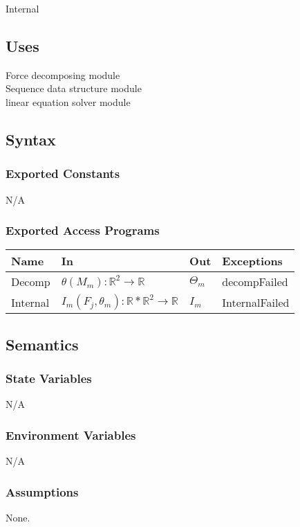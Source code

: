 \documentclass[12pt, titlepage]{article}
\begin{document}
Internal

\subsection{Uses}
Force decomposing module\\
Sequence data structure module\\
linear equation solver module\\



\subsection{Syntax}

\subsubsection{Exported Constants}
N/A
\subsubsection{Exported Access Programs}
\begin{center}
\begin{tabular}{p{2cm} p{4cm} p{4cm} p{2cm}}
\hline
\textbf{Name} & \textbf{In} & \textbf{Out} & \textbf{Exceptions} \\
\hline
Decomp & $\theta(M_{m}):\mathbb{R}^{2} \rightarrow \mathbb{R}$  &$\Theta_m$ & decompFailed \\
Internal & $I_m(F_j,\theta_m):\mathbb{R}*\mathbb{R}^{2} \rightarrow \mathbb{R}$  &$I_m$ & InternalFailed \\
\hline
\end{tabular}
\end{center}
\subsection{Semantics}
\subsubsection{State Variables}
N/A

\subsubsection{Environment Variables}
N/A

\subsubsection{Assumptions}
None.
\end{document}
